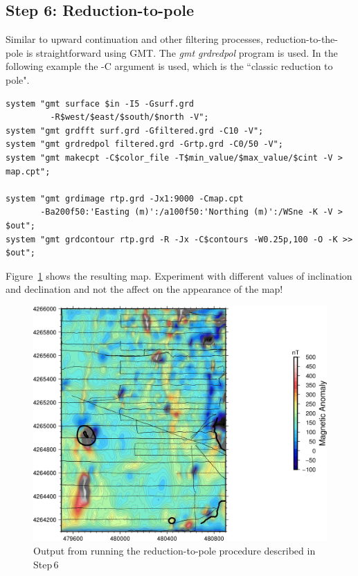 \documentclass[letterpaper,10pt]{report}
\begin{document}
\subsection*{Step 6: Reduction-to-pole}
Similar to upward continuation and other filtering processes, reduction-to-the-pole is straightforward using GMT. The {\it gmt grdredpol} program is used. In the following example the -C argument is used, which is the ``classic reduction to pole".
\begin{verbatim}
system "gmt surface $in -I5 -Gsurf.grd 
         -R$west/$east/$south/$north -V";
system "gmt grdfft surf.grd -Gfiltered.grd -C10 -V";
system "gmt grdredpol filtered.grd -Grtp.grd -C0/50 -V";
system "gmt makecpt -C$color_file -T$min_value/$max_value/$cint -V > map.cpt";

system "gmt grdimage rtp.grd -Jx1:9000 -Cmap.cpt 
       -Ba200f50:'Easting (m)':/a100f50:'Northing (m)':/WSne -K -V > $out";
system "gmt grdcontour rtp.grd -R -Jx -C$contours -W0.25p,100 -O -K >> $out";
\end{verbatim}
Figure~\ref{fig:rtp} shows the resulting map. Experiment with different values of inclination and declination and not the affect on the appearance of the map!

\begin{figure}
    \centering
    \includegraphics[scale=0.75]{./images/mag_rtp.png}
    \caption{
Output from running the reduction-to-pole procedure described in Step\,6}
    \label{fig:rtp}
\end{figure}
\end{document}
